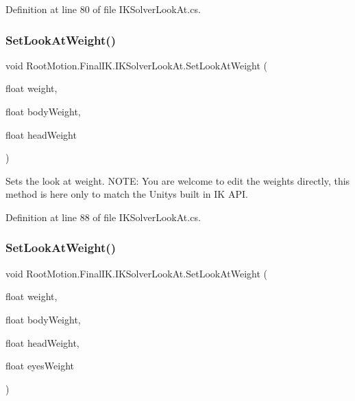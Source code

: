 Definition at line 80 of file I\+K\+Solver\+Look\+At.\+cs.

\mbox{\label{class_root_motion_1_1_final_i_k_1_1_i_k_solver_look_at_aa4341dd272f0c057bb1e9fa0c85deba1}} 
\subsubsection{\texorpdfstring{Set\+Look\+At\+Weight()}{SetLookAtWeight()}\hspace{0.1cm}{\footnotesize\ttfamily [3/6]}}
{\footnotesize\ttfamily void Root\+Motion.\+Final\+I\+K.\+I\+K\+Solver\+Look\+At.\+Set\+Look\+At\+Weight (\begin{DoxyParamCaption}\item[{float}]{weight,  }\item[{float}]{body\+Weight,  }\item[{float}]{head\+Weight }\end{DoxyParamCaption})}



Sets the look at weight. N\+O\+TE\+: You are welcome to edit the weights directly, this method is here only to match the Unity\textquotesingle{}s built in IK A\+PI. 



Definition at line 88 of file I\+K\+Solver\+Look\+At.\+cs.

\mbox{\label{class_root_motion_1_1_final_i_k_1_1_i_k_solver_look_at_a6ee87acb25f784af7f2eb7ed56fceed0}} 
\subsubsection{\texorpdfstring{Set\+Look\+At\+Weight()}{SetLookAtWeight()}\hspace{0.1cm}{\footnotesize\ttfamily [4/6]}}
{\footnotesize\ttfamily void Root\+Motion.\+Final\+I\+K.\+I\+K\+Solver\+Look\+At.\+Set\+Look\+At\+Weight (\begin{DoxyParamCaption}\item[{float}]{weight,  }\item[{float}]{body\+Weight,  }\item[{float}]{head\+Weight,  }\item[{float}]{eyes\+Weight }\end{DoxyParamCaption})}



